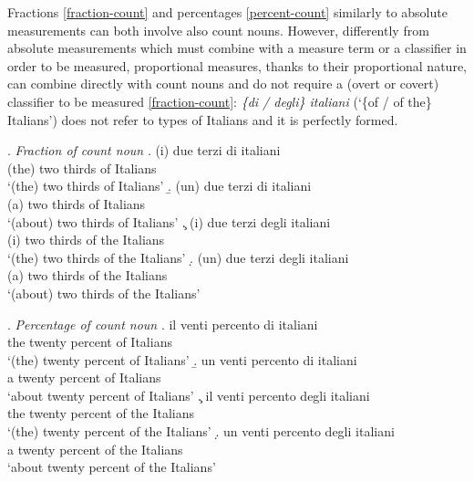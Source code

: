 \documentclass[charis, linguex]{glossa}
\begin{document}
	 

Fractions \ref{fraction-count} and percentages \ref{percent-count} similarly to absolute measurements can both involve also count nouns. However, differently from absolute measurements which must combine with a measure term or a classifier in order to be measured, proportional measures, thanks to their proportional nature, can combine directly with count nouns and do not require a (overt or covert) classifier to be measured \ref{fraction-count}: \textit{\{di / degli\} italiani} (`\{of / {of the}\} Italians') does not refer to types of Italians and it is perfectly formed.

\ex. \textit{Fraction of count noun}  \label{fraction-count}
\a.	\gll (i) due terzi di italiani \\
      (the) two thirds of Italians \\ 
	  \glt  `(the) two thirds of Italians'   \label{fraction-count-a}	  
\b.  \gll (un) due terzi di italiani \\
          (a) two thirds of Italians \\ 
  	  \glt  `(about) two thirds of Italians'   \label{fraction-count-b}
\c.  \gll (i) due terzi degli italiani \\
        (i) two thirds {of the} Italians \\ 
  	  \glt  `(the) two thirds of the Italians'   \label{fraction-count-c}
\d.  \gll (un) due terzi degli italiani \\
        (a) two thirds {of the} Italians \\ 
  	  \glt  `(about) two thirds of the Italians'   \label{fraction-count-d}
	  
\ex. \textit{Percentage of count noun} \label{percent-count}
\a.	\gll il venti percento di italiani \\
       the twenty percent of Italians  \\ 
	 \glt  `(the) twenty percent of Italians'  \label{percent-count-a}
\b. \gll un  venti percento di italiani \\
       a twenty percent of Italians  \\ 
 	 \glt  `about twenty percent of Italians'  \label{percent-count-b}
\c. \gll il venti percento degli italiani \\
        the twenty percent  {of the} Italians  \\ 
 	 \glt  `(the) twenty percent of the Italians'  \label{percent-count-c}
\d. \gll un venti percento degli italiani \\
         a twenty percent  {of the} Italians  \\ 
 	 \glt  `about twenty percent of the Italians'  \label{percent-count-d}
\end{document}
